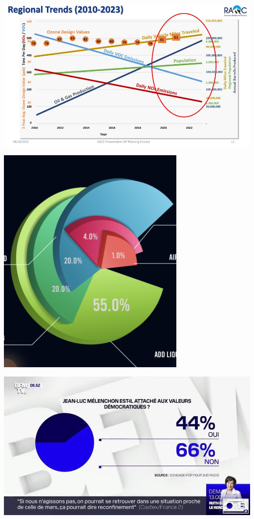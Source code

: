 \documentclass{beamer}
\begin{document}
 \begin{frame}\centering\includegraphics[width=\textwidth,keepaspectratio]{graphcrimes/FaYCYQFWQAAm3DB.jpeg}\end{frame}
 \begin{frame}\centering\includegraphics[width=0.7\textwidth,keepaspectratio]{graphcrimes/FN8ErPaXwAIEdO3.png}\end{frame}
 \begin{frame}\centering\includegraphics[width=\textwidth,keepaspectratio]{graphcrimes/FQHLjS5XwAY4pp1.jpeg}\end{frame}
\end{document}
